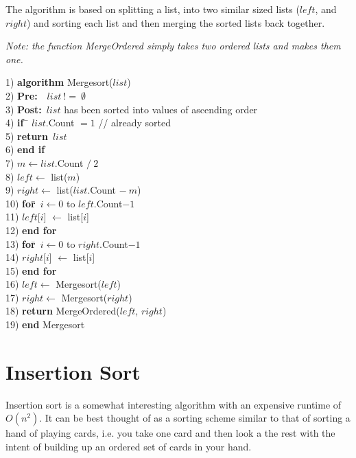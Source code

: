 The algorithm is based on splitting a list, into two similar sized lists ($left$, and $right$) and sorting each list and then merging the sorted lists back together.

\textit{Note: the function MergeOrdered simply takes two ordered lists and makes them one.}

\begin{tabbing}
1)  \textbf{alg}\= \textbf{orithm} Mergesort($list$) \\
2)  \> \textbf{Pre:}~~$list~!=~\emptyset$ \\
3)  \> \textbf{Post:}~$list$ has been sorted into values of ascending order \\
4)  \> \textbf{if}~\= $list$.Count $= 1$ // already sorted \\
5)  \> \> \textbf{return}~$list$ \\
6)  \> \textbf{end if} \\
7)  \> $m \leftarrow list$.Count $/~2$ \\
8)  \> $left \leftarrow$ list($m$) \\
9)  \> $right \leftarrow$ list($list$.Count $-~m$) \\
10) \> \textbf{for}\=~$i \leftarrow 0$ to $left$.Count$-1$ \\
11) \> \> $left$[$i$] $\leftarrow$ list[$i$] \\
12) \> \textbf{end for} \\
13) \> \textbf{for}\=~$i \leftarrow 0$ to $right$.Count$-1$ \\
14) \> \> $right$[$i$] $\leftarrow$ list[$i$] \\
15) \> \textbf{end for} \\
16) \> $left \leftarrow$ Mergesort($left$) \\
17) \> $right \leftarrow$ Mergesort($right$) \\
18) \> \textbf{return} MergeOrdered($left$, $right$) \\
19) \textbf{end} Mergesort \\
\end{tabbing}

\section{Insertion Sort}
Insertion sort is a somewhat interesting algorithm with an expensive runtime of $O(n^{2})$. It can be best thought of as a sorting scheme similar to that of sorting a hand of playing cards, i.e. you take one card and then look a the rest with the intent of building up an ordered set of cards in your hand.

